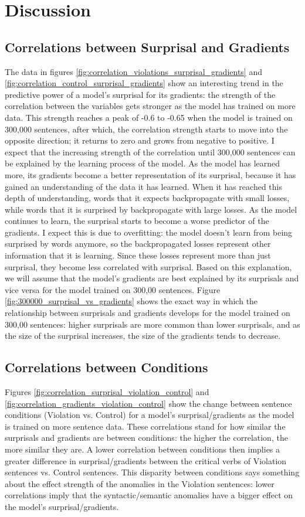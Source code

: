 \documentclass{IEEEtran}
\begin{document}
\section{Discussion}
\subsection{Correlations between Surprisal and Gradients}
The data in figures \ref{fig:correlation_violations_surprisal_gradients} and \ref{fig:correlation_control_surprisal_gradients} show an interesting trend in the predictive power of a model's surprisal for its gradients: the strength of the correlation between the variables gets stronger as the model has trained on more data.
This strength reaches a peak of -0.6 to -0.65 when the model is trained on 300,000 sentences, after which, the correlation strength starts to move into the opposite direction; it returns to zero and grows from negative to positive.
I expect that the increasing strength of the correlation until 300,000 sentences can be explained by the learning process of the model.
As the model has learned more, its gradients become a better representation of its surprisal, because it has gained an understanding of the data it has learned.
When it has reached this depth of understanding, words that it expects backpropagate with small losses, while words that it is surprised by backpropagate with large losses.
As the model continues to learn, the surprisal starts to become a worse predictor of the gradients.
I expect this is due to overfitting: the model doesn't learn from being surprised by words anymore, so the backpropagated losses represent other information that it is learning.
Since these losses represent more than just surprisal, they become less correlated with surprisal.
Based on this explanation, we will assume that the model's gradients are best explained by its surprisals and vice versa for the model trained on 300,00 sentences.
Figure \ref{fig:300000_surprisal_vs_gradients} shows the exact way in which the relationship between surprisals and gradients develops for the model trained on 300,00 sentences: higher surprisals are more common than lower surprisals, and as the size of the surprisal increases, the size of the gradients tends to decrease.

\subsection{Correlations between Conditions}
Figures \ref{fig:correlation_surprisal_violation_control} and \ref{fig:correlation_gradients_violation_control} show the change between sentence conditions (Violation vs. Control) for a model's surprisal/gradients as the model is trained on more sentence data.
These correlations stand for how similar the surprisals and gradients are between conditions: the higher the correlation, the more similar they are.
A lower correlation between conditions then implies a greater difference in surprisal/gradients between the critical verbs of Violation sentences vs. Control sentences.
This disparity between conditions says something about the effect strength of the anomalies in the Violation sentences: lower correlations imply that the syntactic/semantic anomalies have a bigger effect on the model's surprisal/gradients.
\end{document}
